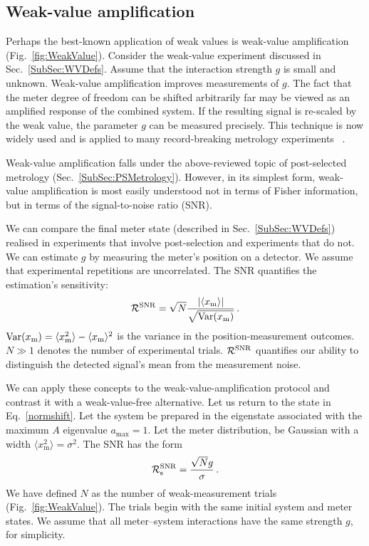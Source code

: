 \documentclass[%
 reprint,
superscriptaddress,
nofootinbib,
bibnotes,
 amsmath,amssymb,
 aps,
]{revtex4-1}
\theoremstyle{plain}
\def\la{\langle}
\def\ra{\rangle}
\def\be{\begin{equation}}
\def\ee{\end{equation}}
\begin{document}
\subsection{Weak-value amplification}
\label{SubSec:WVA}

Perhaps the best-known application of weak values is weak-value amplification (Fig.~\ref{fig:WeakValue}).  
Consider the weak-value experiment discussed in Sec.~\ref{SubSec:WVDefs}. Assume that the interaction strength $g$ is small and unknown. Weak-value amplification improves measurements of $g$.  
The fact that the meter degree of freedom can be shifted arbitrarily far may be viewed as an amplified response of the combined system. If  the resulting signal is re-scaled by the weak value, the parameter $g$ can be measured precisely. This technique is now widely used and is applied to many record-breaking metrology experiments ~\cite{Hosten08,Dixon09,Viza15}.


Weak-value amplification falls under the above-reviewed topic of post-selected metrology (Sec.~\ref{SubSec:PSMetrology}). However, in its simplest form, weak-value amplification is most easily understood not in terms of Fisher information, but in terms of the signal-to-noise ratio (SNR).   

We can compare the final meter state (described in Sec.~\ref{SubSec:WVDefs}) realised in experiments that involve post-selection and experiments that do not.
We can estimate $g$ by  measuring the meter's position on a detector.  We assume that experimental repetitions are uncorrelated. 
The SNR quantifies the estimation's sensitivity:
\be
{\cal R}^{\mathrm{SNR}} = \sqrt{N} \frac{|\la x_{\mathrm{m}} \ra|}{\sqrt{{{\rm Var}(x_{\mathrm{m}} ) }}} \, .
\ee
${\rm Var} (x_{\mathrm{m}}) = \la x_{\mathrm{m}}^2\ra - \la x_{\mathrm{m}}\ra^2$ is the variance in the position-measurement outcomes.
$N \gg 1$ denotes the number of experimental trials.  ${\cal R}^{\mathrm{SNR}}$ quantifies our ability to  distinguish 
the detected signal's mean from the measurement noise.

We can  apply these concepts to the weak-value-amplification protocol and contrast it with a weak-value-free alternative.
Let us return to the state in Eq.~\eqref{normshift}. Let the system be prepared in the eigenstate associated with the maximum $A$ eigenvalue $a_{\mathrm{max}} = 1$. Let the meter distribution, be Gaussian with a width $\la x_{\mathrm{m}}^2\ra = \sigma^2$.  The SNR has the form
\be
{\cal R}^{\mathrm{SNR}} _{\mathrm{s}} = \frac{ \sqrt{N} g}{\sigma} \, . \label{snr}
\ee
We have defined $N$ as the number of weak-measurement trials (Fig.~\ref{fig:WeakValue}). The trials begin with the same initial system and meter states. We assume that all meter--system interactions have the same strength $g$, for simplicity. 
\end{document}
